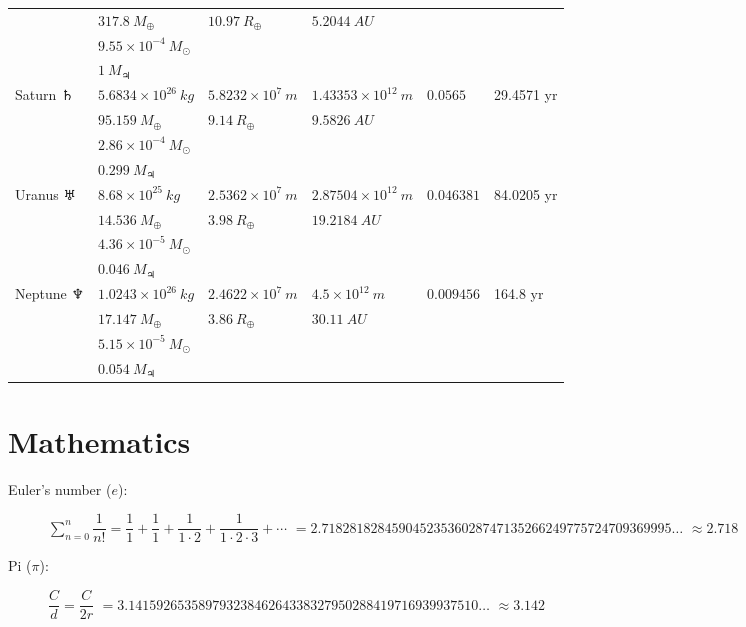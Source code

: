 \begin{tabular}{ |l|l|l|l|l|l| }
					& $317.8\ M_\oplus $				& $10.97\ R_\oplus$			& $5.2044\ AU$					&						&			\\
               		& $9.55 \times 10^{-4}\ M_{\odot}$ 	&							&								&						&			\\
                	& $1\ M_{\jupiter}$				 	&							&								&						&			\\
\hline
Saturn $\saturn$	& $5.6834 \times 10^{26}\ kg$		& $5.8232 \times 10^7\ m$	& $1.43353 \times 10^{12}\ m$	& $0.0565$				& 29.4571 yr\\
					& $95.159\ M_\oplus $				& $9.14\ R_\oplus$			& $9.5826\ AU$					&						&			\\
                	& $2.86 \times 10^{-4}\ M_{\odot}$	&							&								&						&			\\
                    & $0.299\ M_{\jupiter}$				 &							&								&						&			\\
\hline
Uranus $\uranus$	& $8.68 \times 10^{25}\ kg$			& $2.5362 \times 10^7\ m$	& $2.87504 \times 10^{12}\ m$	& $0.046381$			& 84.0205 yr\\
					& $14.536\ M_\oplus $				& $3.98\ R_\oplus$			& $19.2184\ AU$					&						&			\\
                	& $4.36 \times 10^{-5}\ M_{\odot}$ 	&							&								&						&			\\
                    & $0.046\ M_{\jupiter}$				 &							&								&						&			\\
\hline
Neptune	$\neptune$ 	& $1.0243 \times 10^{26}\ kg$		& $2.4622 \times 10^7\ m$	& $4.5 \times 10^{12}\ m$		& $0.009456$			& 164.8 yr\\
					& $17.147\ M_\oplus $				& $3.86\ R_\oplus$			& $30.11\ AU$					&						&			\\
               		& $5.15 \times 10^{-5}\ M_{\odot}$ 	&							&								&						&			\\
                    & $0.054\ M_{\jupiter}$				&							&								&						&			\\
\hline
\end{tabular}


\section{Mathematics}
\begin{description}

\item[Euler's number ($e$):] $\sum\limits_{n=0}^n \dfrac{1}{n!} = \dfrac{1}{1} + \dfrac{1}{1} + \dfrac{1}{1\cdot 2} + \dfrac{1}{1\cdot 2\cdot 3} + \cdots$
\subitem $= 2.71828182845904523536028747135266249775724709369995 \ldots$
\subitem $\approx 2.718$                

\item[Pi ($\pi$):] $\dfrac{C}{d} = \dfrac{C}{2r}$
\subitem $= 3.14159265358979323846264338327950288419716939937510 \ldots$
\subitem $\approx 3.142$
\end{description}